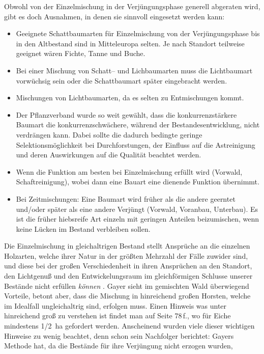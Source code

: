 \documentclass[twocolumn]{scrartcl}
\begin{document}
Obwohl von der Einzelmischung in der Verjüngungsphase generell
abgeraten wird, gibt es doch Ausnahmen, in denen sie sinnvoll
eingesetzt werden kann:
\begin{itemize}
\item Geeignete Schattbaumarten für Einzelmischung von der
  Verjüngungsphase bis in den Altbestand sind in Mitteleuropa
  selten. Je nach Standort teilweise geeignet wären Fichte, Tanne und
  Buche.
\item Bei einer Mischung von Schatt-- und Lichbaumarten muss die
  Lichtbaumart vorwüchsig sein oder die Schattbaumart später
  eingebracht werden.
\item Mischungen von Lichtbaumarten, da es selten zu Entmischungen
  kommt.
\item Der Pflanzverband wurde so weit gewählt, dass die
  konkurrenzstärkere Baumart die konkurrenzschwächere, während der
  Bestandesentwicklung, nicht verdrängen kann. Dabei sollte die
  dadurch bedingte geringe Selektionsmöglichkeit bei Durchforstungen,
  der Einfluss auf die Astreinigung und deren Auswirkungen auf die
  Qualität beachtet werden.
\item Wenn die Funktion am besten bei Einzelmischung erfüllt wird
  (Vorwald, Schaftreinigung), wobei dann eine Bauart eine dienende
  Funktion übernimmt.
\item Bei Zeitmischungen: Eine Baumart wird früher als die andere
  geerntet und/oder später als eine andere Verjüngt (Vorwald,
  Voranbau, Unterbau). Es ist die früher hiebsreife Art einzeln mit
  geringen Anteilen beizumischen, wenn keine Lücken im Bestand
  verbleiben sollen.
\end{itemize}
\frqq Die Einzelmischung in gleichaltrigen Bestand stellt Ansprüche an
die einzelnen Holzarten, welche ihrer Natur in der größten Mehrzahl
der Fälle zuwider sind, und diese bei der großen Verschiedenheit in
ihren Ansprüchen an den Standort, den Lichtgenuß und den
Entwickelungsraum im gleichförmigen Schlusse unserer Bestände nicht
erfüllen \emph{können}\flqq{}
\citep[S.~147]{gayer1886DerGemischteWald}. Gayer sieht im gemischten
Wald überwiegend Vorteile, betont aber, dass die Mischung in
hinreichend großen Horsten, welche im Idealfall ungleichaltrig sind,
erfolgen muss. Einen Hinweis was unter hinreichend groß zu verstehen ist
findet man auf Seite 78\,f., wo für Eiche mindestens 1/2~ha gefordert
werden. Anscheinend wurden viele dieser wichtigen Hinweise zu wenig
beachtet, denn schon sein Nachfolger berichtet: \frqq Gayers Methode
hat, da die Bestände für ihre Verjüngung nicht erzogen wurden,
\end{document}
